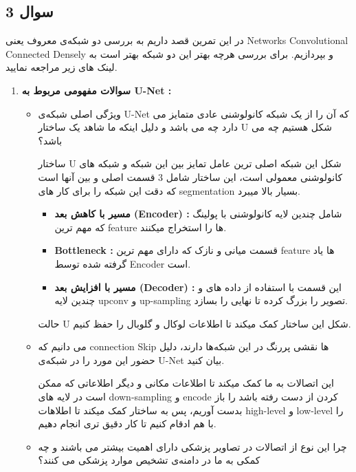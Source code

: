 \subsection{سوال 3}

در این تمرین قصد داریم به بررسی دو شبکەی معروف یعنی Networks Convolutional Connected Densely\cite{huang2018densely}
و \cite{ronneberger2015unet} بپردازیم. برای بررسی هرچه بهتر این دو شبکه بهتر است به لینک های زیر مراجعه نمایید.


\begin{enumerate}
	\item {
	      \textbf{سوالات مفهومی مربوط به U-Net :}
	      \begin{itemize}
		      \item {
		            ویژگی اصلی شبکەی U-Net که آن را از یک شبکه کانولوشنی عادی متمایز می دارد چه می باشد و دلیل اینکه ما شاهد یک ساختار U شکل هستیم چه می باشد؟

		            \begin{qsolve}[]
			            ساختار U شکل این شبکه اصلی ترین عامل تمایز بین این شبکه و شبکه های کانولوشنی معمولی است،
			            این ساختار شامل 3 قسمت اصلی و  بین آنها است که دقت این شبکه را برای کار های
			            segmentation بسیار بالا میبرد.
			            \begin{itemize}
				            \item {
				                  \textbf{مسیر با کاهش بعد (Encoder) :} شامل چندین لایه کانولوشنی با پولینگ که مهم ترین feature ها را استخراج میکنند.
				                  }
				            \item {
				                  \textbf{Bottleneck : } قسمت میانی و نازک که دارای مهم ترین feature ها یاد گرفته شده توسط Encoder است.
				                  }
				            \item {
				                  \textbf{مسیر با افزایش بعد (Decoder) :} این قسمت با استفاده از داده های  و چندین لایه upconv و up-sampling تصویر را بزرگ کرده تا  نهایی را بسازد.
				                  }
			            \end{itemize}
			            حالت U شکل این ساختار کمک میکند تا اطلاعات لوکال و گلوبال را حفظ کنیم.
		            \end{qsolve}
		            }
		      \item {
		            می دانیم که connection Skip ها نقشی پررنگ در این شبکەها دارند، دلیل حضور این مورد را در
		            شبکەی U-Net بیان کنید.

		            \begin{qsolve}[]
			            این اتصالات به ما کمک میکند تا اطلاعات مکانی و دیگر اطلاعاتی که ممکن است در لایه های down-sampling و encode کردن
			            از دست رفته باشد را باز بدست آوریم، پس به ساختار کمک میکند تا اطلاهات high-level و low-level را با هم ادقام کنیم تا کار دقیق تری انجام دهیم.
		            \end{qsolve}
		            }
		      \item {
		            چرا این نوع از اتصالات در تصاویر پزشکی دارای
		            اهمیت بیشتر می باشند و چه کمکی به ما در دامنەی تشخیص موارد پزشکی می کنند؟

}
\end{itemize}}
\end{enumerate}
